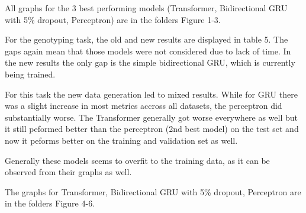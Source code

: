 \documentclass[11pt, a4paper]{article}
\begin{document}
All graphs for the 3 best performing models (Transformer, Bidirectional GRU with 5\% dropout, Perceptron) are in the folders Figure 1-3.

For the genotyping task, the old and new results are displayed in table 5. The gaps again mean that those models were not considered due to lack of time. In the new results the only gap is the simple bidirectional GRU, which is currently being trained.

For this task the new data generation led to mixed results. While for GRU there was a slight increase in most metrics accross all datasets, the perceptron did substantially worse. The Transformer generally got worse everywhere as well but it still peformed better than the perceptron (2nd best model) on the test set and now it peforms better on the training and validation set as well.

Generally these models seems to overfit to the training data, as it can be observed from their graphs as well. 

The graphs for Transformer, Bidirectional GRU with 5\% dropout, Perceptron are in the folders Figure 4-6.

\clearpage
\nocite{*}
\printbibliography
\end{document}
